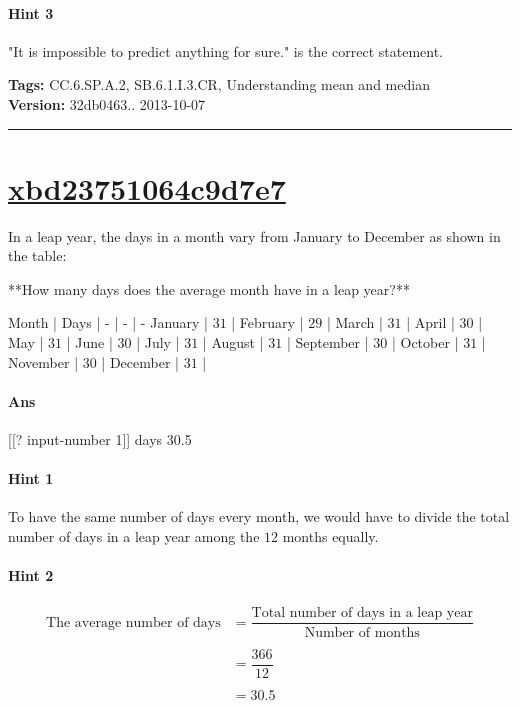 \documentclass[twocolumn,10pt]{article}
\begin{document}
\paragraph{Hint 3}"It is impossible to predict anything for sure." is the correct statement.



\medskip
\noindent
\textbf{Tags:} {\footnotesize CC.6.SP.A.2, SB.6.1.I.3.CR, Understanding mean and median}\\
\textbf{Version:} 32db0463.. 2013-10-07
\smallskip\hrule





\section{\href{https://www.khanacademy.org/devadmin/content/items/xbd23751064c9d7e7}{xbd23751064c9d7e7}}

\noindent
In a leap year, the days in a month vary from January to December as shown in the table:  

**How many days does the average month have in a leap year?**

Month | Days | 
- | - | -
January | $31$ | 
February | $29$ | 
March | $31$ | 
April | $30$ | 
May | $31$ | 
June | $30$ | 
July | $31$ | 
August | $31$ | 
September | $30$ | 
October | $31$ | 
November | $30$ | 
December | $31$ | 


\paragraph{Ans} [[? input-number 1]] days  30.5

\paragraph{Hint 1}To have the same number of days every month, we would have to divide the total number of days in a leap year among the $12$ months equally.  

\paragraph{Hint 2}\begin{align*}\text{The average number of days} &= \dfrac{\text{Total number of days in a leap year}}{\text{Number of months}}\\ 
\\
&= \dfrac{366}{12}\\
\\
&=30.5\end{align*}
\end{document}
